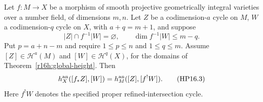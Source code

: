 \begin{corollary}
\label{r16hp:height-projection}
Let $f:M\to X$ be a morphism of smooth projective geometrically
integral varieties over a number field, of dimensions $m,n$.
Let $Z$ be a codimension-$a$ cycle on $M$, $W$ a codimension-$q$
cycle on $X$, with $a+q=m+1$, and suppose
\[
 |Z|\cap f^{-1}|W|=\varnothing,\qquad
 \dim f^{-1}|W|\leq m-q.
\]
Put $p=a+n-m$ and require $1\leq p\leq n$ and $1\leq q\leq m$.
Assume $[Z]\in\mathcal H^a(M)$ and $[W]\in\mathcal H^q(X)$,
for the domains of Theorem~\ref{r16h:global-height}. Then
\[
             h_X^{\rm an}([f_*Z],[W])
                       =h_M^{\rm an}([Z],[f^!W]).
 \tag{HP16.3}\label{r16hp:height-projection-eq}
\]
Here $f^!W$ denotes the specified proper refined-intersection cycle.
\end{corollary}

